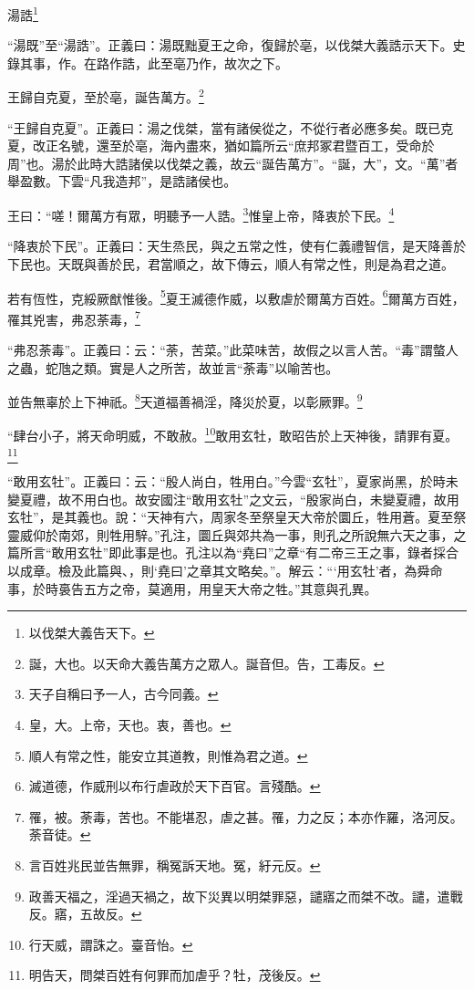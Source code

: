 湯誥\footnote{以伐桀大義告天下。}

{\noindent\shu{}\fzkt “湯既”至“湯誥”。正義曰：湯既黜夏王之命，復歸於亳，以伐桀大義誥示天下。史錄其事，作。在路作誥，此至亳乃作，故次之下。 \par}

王歸自克夏，至於亳，誕告萬方。\footnote{誕，大也。以天命大義告萬方之眾人。誕音但。告，工毒反。}

{\noindent\shu{}\fzkt “王歸自克夏”。正義曰：湯之伐桀，當有諸侯從之，不從行者必應多矣。既已克夏，改正名號，還至於亳，海內盡來，猶如篇所云“庶邦冢君暨百工，受命於周”也。湯於此時大誥諸侯以伐桀之義，故云“誕告萬方”。“誕，大”，文。“萬”者舉盈數。下雲“凡我造邦”，是誥諸侯也。 \par}

王曰：“嗟！爾萬方有眾，明聽予一人誥。\footnote{天子自稱曰予一人，古今同義。}惟皇上帝，降衷於下民。\footnote{皇，大。上帝，天也。衷，善也。}

{\noindent\shu{}\fzkt “降衷於下民”。正義曰：天生烝民，與之五常之性，使有仁義禮智信，是天降善於下民也。天既與善於民，君當順之，故下傳云，順人有常之性，則是為君之道。 \par}

若有恆性，克綏厥猷惟後。\footnote{順人有常之性，能安立其道教，則惟為君之道。}夏王滅德作威，以敷虐於爾萬方百姓。\footnote{滅道德，作威刑以布行虐政於天下百官。言殘酷。}爾萬方百姓，罹其兇害，弗忍荼毒，\footnote{罹，被。荼毒，苦也。不能堪忍，虐之甚。罹，力之反；本亦作羅，洛河反。荼音徒。}

{\noindent\shu{}\fzkt “弗忍荼毒”。正義曰：云：“荼，苦菜。”此菜味苦，故假之以言人苦。“毒”謂螫人之蟲，蛇虺之類。實是人之所苦，故並言“荼毒”以喻苦也。 \par}

並告無辜於上下神祇。\footnote{言百姓兆民並告無罪，稱冤訴天地。冤，紆元反。}天道福善禍淫，降災於夏，以彰厥罪。\footnote{政善天福之，淫過天禍之，故下災異以明桀罪惡，譴寤之而桀不改。譴，遣戰反。寤，五故反。}

“肆台小子，將天命明威，不敢赦。\footnote{行天威，謂誅之。臺音怡。}敢用玄牡，敢昭告於上天神後，請罪有夏。\footnote{明告天，問桀百姓有何罪而加虐乎？牡，茂後反。}

{\noindent\shu{}\fzkt “敢用玄牡”。正義曰：云：“殷人尚白，牲用白。”今雲“玄牡”，夏家尚黑，於時未變夏禮，故不用白也。故安國注“敢用玄牡”之文云，“殷家尚白，未變夏禮，故用玄牡”，是其義也。說：“天神有六，周家冬至祭皇天大帝於圜丘，牲用蒼。夏至祭靈威仰於南郊，則牲用騂。”孔注，圜丘與郊共為一事，則孔之所說無六天之事，之篇所言“敢用玄牡”即此事是也。孔注以為“堯曰”之章“有二帝三王之事，錄者採合以成章。檢及此篇與、，則‘堯曰’之章其文略矣。”。解云：“‘用玄牡’者，為舜命事，於時裛告五方之帝，莫適用，用皇天大帝之牲。”其意與孔異。 \par}


